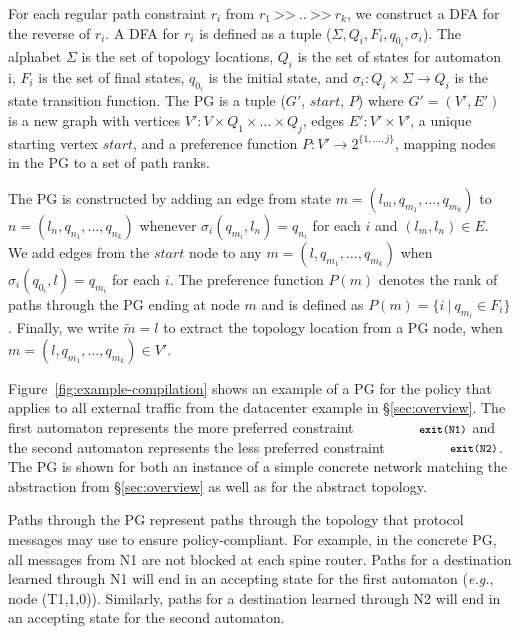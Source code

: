 \documentclass[numbers, 10pt, preprint]{sigplanconf}
\newcommand{\EG}{\emph{e.g.}}
\newcommand{\set}[1]{\ensuremath{\{ #1 \} }}
\newcommand{\CD}[1]{\texttt{\small #1}}  %
\newcommand{\KW}[1]{\texttt{\small\bfseries{#1}}}
\newcommand{\True}{\CD{true}}
\newcommand{\Prefer}{\texttt{>>}}
\newcommand{\Path}{\texttt{=>}}
\newcommand{\Exit}{\KW{exit}}
\begin{document}
For each regular path constraint $r_i$ from $r_1 ~\Prefer~ .. ~\Prefer~ r_k$, we construct a DFA for the reverse of $r_i$. A DFA for $r_i$ is defined as a tuple ($\Sigma, Q_i, F_i, q_{0_i}, \sigma_i$). The alphabet $\Sigma$ is the set of topology locations, $Q_i$ is the set of states for automaton i, $F_i$ is the set of final states, $q_{0_i}$ is the initial state, and $\sigma_i \colon Q_i \times \Sigma \rightarrow Q_i$ is the state transition function.
%
The PG is a tuple ($G'$, $start$, $P$) where $G' = (V',E')$ is a new graph with
vertices $V' \colon V \times Q_1 \times \dots \times Q_j$,
edges $E' \colon V' \times V'$,
a unique starting vertex $start$,
and a preference function $P \colon V' \rightarrow 2^{\set{1, \dots, j}}$, mapping nodes in the PG to a set of path ranks.

The PG is constructed by adding an edge from state $m = (l_m, q_{m_1}, \dots, q_{m_k})$ to $n = (l_n, q_{n_1}, \dots, q_{n_k})$ whenever $\sigma_i(q_{m_i}, l_n) = q_{n_i}$ for each $i$ and $(l_m,l_n) \in E$.
%
We add edges from the $\mathit{start}$ node to any $m = (l, q_{m_1}, \dots, q_{m_k})$ when $\sigma_i(q_{0_i}, l) = q_{m_i}$ for each $i$.
%
The preference function $P(m)$ denotes the rank of paths through the PG ending at node $m$ and is defined as $P(m) = \set{i~\vert~q_{m_i} \in F_i}$.
%
Finally, we write $\tilde{m} = l$ to extract the topology location from a PG node, when $m = (l, q_{m_1}, \dots, q_{m_k}) \in V'$.

Figure~\ref{fig:example-compilation} shows an example of a PG for the policy that applies to all external traffic from the datacenter example in \S\ref{sec:overview}.
%
%
The first automaton represents the more preferred constraint $\CD{\Exit(N1)}$ and the second automaton represents the less preferred constraint $\CD{\Exit(N2)}$. The PG is shown for both an instance of a simple concrete network matching the abstraction from \S\ref{sec:overview} as well as for the abstract topology.

Paths through the PG represent paths through the topology that protocol messages may use to ensure policy-compliant. For example, in the concrete PG, all messages from N1 are not blocked at each spine router. Paths for a destination learned through N1 will end in an accepting state for the first automaton (\EG, node (T1,1,0)). Similarly, paths for a destination learned through N2 will end in an accepting state for the second automaton.
\end{document}
